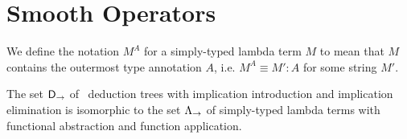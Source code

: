 \section{Smooth Operators}
\label{section:bijection}

\begin{definition}
We define the notation $M^{A}$ for a simply-typed lambda term $M$ to mean that
$M$ contains the outermost type annotation $A$, i.e. $M^A \equiv M':A$ for some
string $M'$.
\end{definition}

\begin{theorem}
The set $\mathsf{D}_\to$ of \implnpi\ deduction trees with implication introduction
and implication elimination is isomorphic to the set $\Lambda_\to$ of
simply-typed lambda terms with functional abstraction and function application.
\end{theorem}

